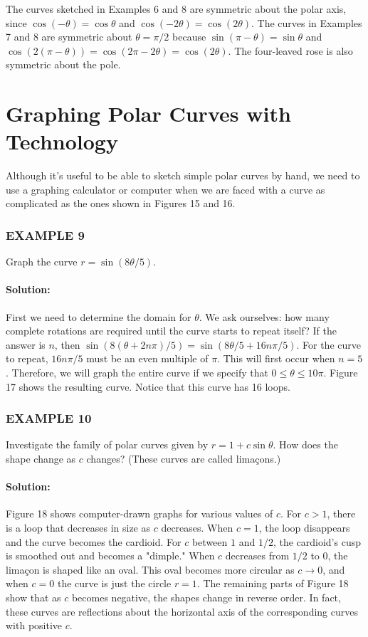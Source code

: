 \documentclass{article}
\begin{document}
The curves sketched in Examples 6 and 8 are symmetric about the polar axis, since $\cos(-\theta)=\cos\theta$ and $\cos(-2\theta)=\cos(2\theta)$. The curves in Examples 7 and 8 are symmetric about $\theta=\pi/2$ because $\sin(\pi-\theta)=\sin\theta$ and $\cos(2(\pi-\theta))=\cos(2\pi-2\theta)=\cos(2\theta)$. The four-leaved rose is also symmetric about the pole.

\section*{Graphing Polar Curves with Technology}
Although it's useful to be able to sketch simple polar curves by hand, we need to use a graphing calculator or computer when we are faced with a curve as complicated as the ones shown in Figures 15 and 16.

\subsubsection*{EXAMPLE 9}
Graph the curve $r=\sin(8\theta/5)$.

\paragraph{Solution:} First we need to determine the domain for $\theta$. We ask ourselves: how many complete rotations are required until the curve starts to repeat itself? If the answer is $n$, then $\sin(8(\theta+2n\pi)/5) = \sin(8\theta/5 + 16n\pi/5)$. For the curve to repeat, $16n\pi/5$ must be an even multiple of $\pi$. This will first occur when $n=5$. Therefore, we will graph the entire curve if we specify that $0 \le \theta \le 10\pi$. Figure 17 shows the resulting curve. Notice that this curve has 16 loops.

\subsubsection*{EXAMPLE 10}
Investigate the family of polar curves given by $r=1+c\sin\theta$. How does the shape change as $c$ changes? (These curves are called limaçons.)

\paragraph{Solution:} Figure 18 shows computer-drawn graphs for various values of $c$. For $c>1$, there is a loop that decreases in size as $c$ decreases. When $c=1$, the loop disappears and the curve becomes the cardioid. For $c$ between $1$ and $1/2$, the cardioid's cusp is smoothed out and becomes a "dimple." When $c$ decreases from $1/2$ to $0$, the limaçon is shaped like an oval. This oval becomes more circular as $c \to 0$, and when $c=0$ the curve is just the circle $r=1$. The remaining parts of Figure 18 show that as $c$ becomes negative, the shapes change in reverse order. In fact, these curves are reflections about the horizontal axis of the corresponding curves with positive $c$.
\end{document}
